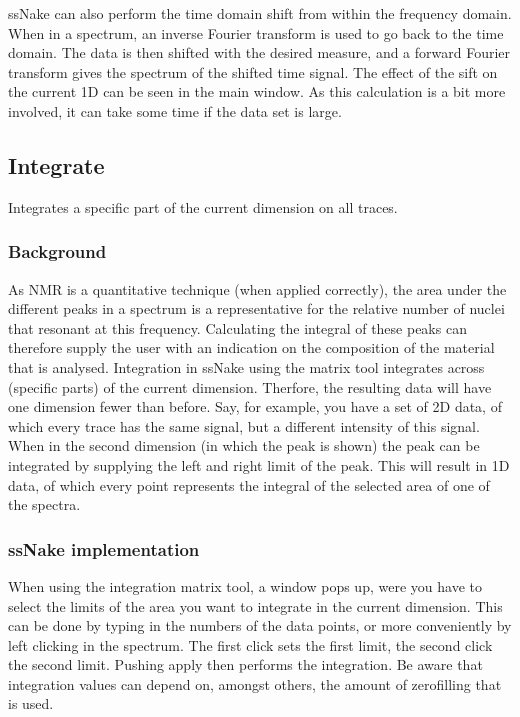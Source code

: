 \documentclass[11pt,a4paper]{article}
\begin{document}
ssNake can also perform the time domain shift from within the frequency domain. When in a spectrum, an inverse Fourier transform is used to go back to the time domain. The data is then shifted with the desired measure, and a forward Fourier transform gives the spectrum of the shifted time signal. The effect of the sift on the current 1D can be seen in the main window. As this calculation is a bit more involved, it can take some time if the data set is large.


\subsection{Integrate}
Integrates a specific part of the current dimension on all traces.

\subsubsection*{Background}
As NMR is a quantitative technique (when applied correctly), the area under the different peaks in a spectrum is a representative for the relative number of nuclei that resonant at this frequency. Calculating the integral of these peaks can therefore supply the user with an indication on the composition of the material that is analysed. Integration in ssNake using the matrix tool integrates across (specific parts) of the current dimension. Therfore, the resulting data will have one dimension fewer than before. Say, for example, you have a set of 2D data, of which every trace has the same signal, but a different intensity of this signal. When in the second dimension (in which the peak is shown) the peak can be integrated by supplying the left and right limit of the peak. This will result in 1D data, of which every point represents the integral of the selected area of one of the spectra.

\subsubsection*{ssNake implementation}
When using the integration matrix tool, a window pops up, were you have to select the limits of the area you want to integrate in the current dimension. This can be done by typing in the numbers of the data points, or more conveniently by left clicking in the spectrum. The first click sets the first limit, the second click the second limit. Pushing apply then performs the integration. Be aware that integration values can depend on, amongst others, the amount of zerofilling that is used.
\end{document}
